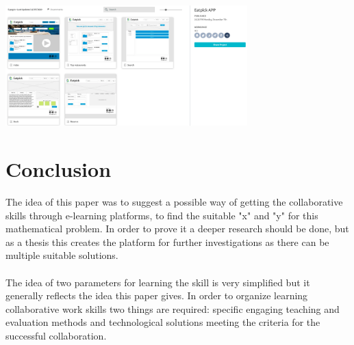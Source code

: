 \documentclass[10pt,oneside,english,a4paper]{article}
\begin{document}
\begin{center}
\includegraphics[width=0.7\textwidth]{Axure.png} 
\end{center}
\section{Conclusion} \label{zaver} 
The idea of this paper was to suggest a possible way of getting the collaborative skills through e-learning platforms, to find the suitable "x" and "y" for this mathematical problem. In order to prove it a deeper research should be done, but as a thesis this creates the platform for further investigations as there can be multiple suitable solutions. \paragraph{} 
The idea of two parameters for learning the skill is very simplified but it generally reflects the idea this paper gives. In order to organize learning collaborative work skills two things are required: specific engaging teaching and evaluation methods and technological solutions meeting the criteria for the successful collaboration.


 
\end{document}
